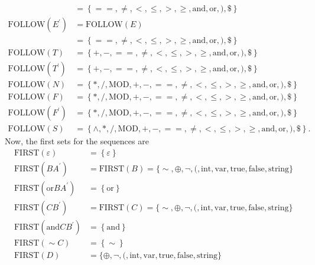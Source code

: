 \documentclass{report}
\begin{document}
\begin{itemize}
\begin{align*}
                                 &= \left\{==, \ne, <, \leq, >, \geq, \text{and}, \text{or}, ), \$\right\} \\
                \text{FOLLOW}(E^{\prime}) &= \text{FOLLOW}(E) \\
                                          &= \left\{==, \ne, <, \leq, >, \geq, \text{and}, \text{or}, ), \$\right\} \\
                \text{FOLLOW}(T) &= \left\{+, -, ==, \ne, <, \leq, >, \geq, \text{and}, \text{or}, ), \$\right\} \\ 
                \text{FOLLOW}(T^{\prime}) &= \left\{+, -, ==, \ne, <, \leq, >, \geq, \text{and}, \text{or}, ), \$\right\} \\ 
                \text{FOLLOW}(N) &= \left\{*, /, \text{MOD}, +, -, ==, \ne, <, \leq, >, \geq, \text{and}, \text{or}, ), \$\right\} \\ 
                \text{FOLLOW}(F) &= \left\{*, /, \text{MOD}, +, -, ==, \ne, <, \leq, >, \geq, \text{and}, \text{or}, ), \$\right\} \\ 
                \text{FOLLOW}(F^{\prime}) &= \left\{*, /, \text{MOD}, +, -, ==, \ne, <, \leq, >, \geq, \text{and}, \text{or}, ), \$\right\} \\ 
                \text{FOLLOW}(S) &= \left\{\land, *, /, \text{MOD}, +, -, ==, \ne, <, \leq, >, \geq, \text{and}, \text{or}, ), \$\right\} 
            .\end{align*}
            Now, the first sets for the sequences are
            \begin{align*}
                \text{FIRST}(\varepsilon) &= \left\{\varepsilon\right\}  \\
                \text{FIRST}(BA^{\prime}) &= \text{FIRST}(B) = \{\sim, \oplus,\neg,(, \text{int}, \text{var}, \text{true}, \text{false}, \text{string}\} \\
                \text{FIRST}(\text{or} BA^{\prime}) &= \left\{\text{or}\right\} \\
                \text{FIRST}(CB^{\prime}) &= \text{FIRST}(C) = \{\sim, \oplus,\neg,(, \text{int}, \text{var}, \text{true}, \text{false}, \text{string}\} \\
                \text{FIRST}(\text{and}CB^{\prime}) &= \left\{\text{and}\right\} \\
                \text{FIRST}(\sim C) &= \left\{\sim\right\} \\
                \text{FIRST}(D) &= \{\oplus,\neg,(, \text{int}, \text{var}, \text{true}, \text{false}, \text{string}\} \\

\end{align*}
\end{itemize}
\end{document}
